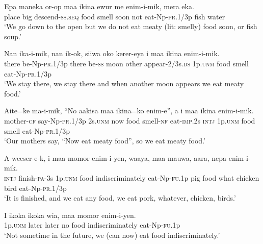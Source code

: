 \ea\label{ex:a:x16}
\gll  Epa  maneka  or-op  maa  ikina  ewur  me  enim-i-mik,         mera  eka. \\
place  big  descend-\textsc{ss.seq}  food  smell  soon  not  eat-Np-\textsc{pr}.1/3p  fish  water \\


\glt ‘We go down to the open but we do not eat meaty (lit: smelly) food soon, or fish soup.’ \\
\z


\ea\label{ex:a:x17}
\gll  Nan  ika-i-mik,  nan  ik-ok,  siiwa  oko  kerer-eya  i             maa  ikina  enim-i-mik. \\
there  be-Np-\textsc{pr}.1/3p  there  be-\textsc{ss}  moon  other  appear-2/3s.\textsc{ds}  1p.\textsc{unm}  food  smell  eat-Np-\textsc{pr}.1/3p \\


\glt ‘We stay there, we stay there and when another moon appears we eat meaty food.’ \\
\z


\ea\label{ex:a:x18}
\gll  Aite=ke  ma-i-mik,  “No  aakisa  maa  ikina=ko  enim-e”,  a        i  maa  ikina  enim-i-mik. \\
mother-\textsc{cf}  say-Np-\textsc{pr}.1/3p  2s.\textsc{unm}  now  food  smell-\textsc{nf}  eat-\textsc{imp}.2s  \textsc{intj} 1p.\textsc{unm}  food  smell  eat-Np-\textsc{pr}.1/3p \\


\glt ‘Our mothers say, “Now eat meaty food”, so we eat meaty food.’ \\
\z


\ea\label{ex:a:x19}
\gll  A  weeser-e-k,  i  maa  momor  enim-i-yen,  waaya,                maa  mauwa,  aara,  nepa  enim-i-mik. \\
\textsc{intj}  finish-\textsc{pa}-3s  1p.\textsc{unm}  food  indiscriminately  eat-Np-\textsc{fu}.1p  pig   food  what  chicken  bird  eat-Np-\textsc{pr}.1/3p \\


\glt ‘It is finished, and we eat any food, we eat pork, whatever, chicken, birds.’ \\
\z


\ea\label{ex:a:x20}
\gll  I  ikoka  ikoka  wia,  maa  momor  enim-i-yen. \\
1p.\textsc{unm}  later  later  no  food  indiscriminately  eat-Np-\textsc{fu}.1p \\
\glt ‘Not sometime in the future, we (can now) eat food indiscriminately.’ \\
\z


